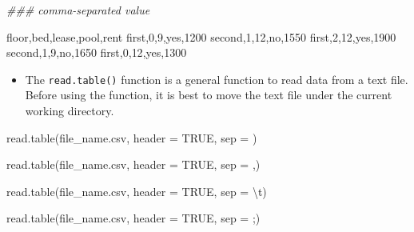 \documentclass[
  letterpaper,
  DIV=11,
  numbers=noendperiod]{scrreprt}
\newenvironment{Shaded}{\begin{snugshade}}{\end{snugshade}}
\newcommand{\AttributeTok}[1]{\textcolor[rgb]{0.40,0.45,0.13}{#1}}
\newcommand{\ConstantTok}[1]{\textcolor[rgb]{0.56,0.35,0.01}{#1}}
\newcommand{\DecValTok}[1]{\textcolor[rgb]{0.68,0.00,0.00}{#1}}
\newcommand{\DocumentationTok}[1]{\textcolor[rgb]{0.37,0.37,0.37}{\textit{#1}}}
\newcommand{\FunctionTok}[1]{\textcolor[rgb]{0.28,0.35,0.67}{#1}}
\newcommand{\NormalTok}[1]{\textcolor[rgb]{0.00,0.23,0.31}{#1}}
\newcommand{\SpecialCharTok}[1]{\textcolor[rgb]{0.37,0.37,0.37}{#1}}
\newcommand{\StringTok}[1]{\textcolor[rgb]{0.13,0.47,0.30}{#1}}
\providecommand{\tightlist}{%
  \setlength{\itemsep}{0pt}\setlength{\parskip}{0pt}}\usepackage{longtable,booktabs,array}
\begin{document}
\begin{Shaded}
\begin{Highlighting}[]
\DocumentationTok{\#\#\# comma{-}separated value}

\NormalTok{floor,bed,lease,pool,rent}
\NormalTok{first,}\DecValTok{0}\NormalTok{,}\DecValTok{9}\NormalTok{,yes,}\DecValTok{1200}
\NormalTok{second,}\DecValTok{1}\NormalTok{,}\DecValTok{12}\NormalTok{,no,}\DecValTok{1550}
\NormalTok{first,}\DecValTok{2}\NormalTok{,}\DecValTok{12}\NormalTok{,yes,}\DecValTok{1900}
\NormalTok{second,}\DecValTok{1}\NormalTok{,}\DecValTok{9}\NormalTok{,no,}\DecValTok{1650}
\NormalTok{first,}\DecValTok{0}\NormalTok{,}\DecValTok{12}\NormalTok{,yes,}\DecValTok{1300}
\end{Highlighting}
\end{Shaded}

\begin{itemize}
\tightlist
\item
  The \texttt{read.table()} function is a general function to read data
  from a text file. Before using the function, it is best to move the
  text file under the current working directory.
\end{itemize}

\begin{Shaded}
\begin{Highlighting}[]
\FunctionTok{read.table}\NormalTok{(}\StringTok{\textquotesingle{}file\_name.csv\textquotesingle{}}\NormalTok{, }\AttributeTok{header =} \ConstantTok{TRUE}\NormalTok{, }\AttributeTok{sep =} \StringTok{\textquotesingle{} \textquotesingle{}}\NormalTok{)}

\FunctionTok{read.table}\NormalTok{(}\StringTok{\textquotesingle{}file\_name.csv\textquotesingle{}}\NormalTok{, }\AttributeTok{header =} \ConstantTok{TRUE}\NormalTok{, }\AttributeTok{sep =} \StringTok{\textquotesingle{},\textquotesingle{}}\NormalTok{)}

\FunctionTok{read.table}\NormalTok{(}\StringTok{\textquotesingle{}file\_name.csv\textquotesingle{}}\NormalTok{, }\AttributeTok{header =} \ConstantTok{TRUE}\NormalTok{, }\AttributeTok{sep =} \StringTok{\textquotesingle{}}\SpecialCharTok{\textbackslash{}t}\StringTok{\textquotesingle{}}\NormalTok{)}

\FunctionTok{read.table}\NormalTok{(}\StringTok{\textquotesingle{}file\_name.csv\textquotesingle{}}\NormalTok{, }\AttributeTok{header =} \ConstantTok{TRUE}\NormalTok{, }\AttributeTok{sep =} \StringTok{\textquotesingle{};\textquotesingle{}}\NormalTok{)}
\end{Highlighting}
\end{Shaded}
\end{document}
